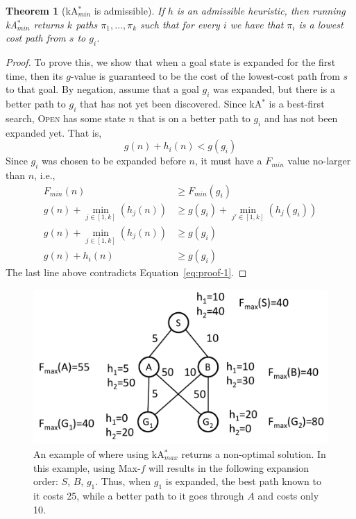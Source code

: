 \documentclass{aicom2e}
\newtheorem{theorem}{Theorem}
\newcommand{\kastar}{kA$^*$}
\newcommand{\kastarmin}{kA$^*_{min}$}
\newcommand{\kastarmax}{kA$^*_{max}$}
\newcommand{\open}{\textsc{Open}}
\begin{document}
\begin{theorem}[\kastarmin{} is admissible]
If $h$ is an admissible heuristic, then running \kastarmin{} returns $k$ paths
$\pi_1,\ldots, \pi_k$ such that for every $i$ we have that $\pi_i$ is a lowest cost
path from $s$ to $g_i$. \label{the:min-f}
\end{theorem}
 \begin{proof}
To prove this, we show that when a goal state is expanded for the first time,
then its $g$-value is guaranteed to be the cost of the lowest-cost path from
$s$ to that goal. By negation, assume that a goal $g_i$ was expanded, but there
is a better path to $g_i$ that has not yet been discovered. Since \kastar{} is
a best-first search, \open{} has some state $n$ that is on a better path to
$g_i$ and has not been expanded yet. That is,
\begin{equation}
g(n)+h_i(n)<g(g_i)
\label{eq:proof-1}
\end{equation}
Since $g_i$ was chosen to be expanded before $n$, it must have a $F_{min}$ value no-larger than $n$, i.e.,
\begin{align}
F_{min}(n) &\geq  F_{min}(g_i)\\
g(n)+\min_{j\in [1,k]}(h_j(n))& \geq  g(g_i)+\min_{j'\in [1,k]}(h_j(g_i))\\
g(n)+\min_{j\in [1,k]}(h_j(n))& \geq  g(g_i)\\
g(n)+h_i(n) &\geq  g(g_i)
\end{align}
The last line above contradicts Equation~\ref{eq:proof-1}.
\end{proof}


 
 \begin{figure}
 \includegraphics[width=\columnwidth]{max-bad_cropped.pdf}      
 \caption{An example of where using \kastarmax{} returns a non-optimal solution. In this example, 
 using Max-$f$ will results in the following expansion order: $S$, $B$, $g_1$. 
 Thus, when $g_1$ is expanded, the best path known to it costs 25, while a 
 better path to it goes through $A$ and costs only 10.}
 \label{fig:max-bad}
 \end{figure}
 
\end{document}
